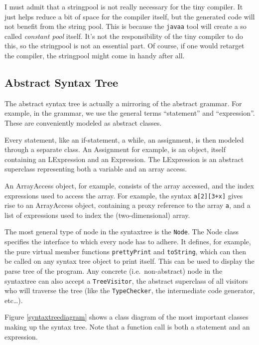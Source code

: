 \documentclass[a4paper]{article}
\begin{document}
I must admit that a stringpool is not really necessary for the tiny compiler.
It just helps reduce a bit of space for the compiler itself, but the generated
code will not benefit from the string pool. This is because the \texttt{javaa}
tool will create a so called \emph{constant pool} itself. It's not the
responsibility of the tiny compiler to do this, so the stringpool is not an
essential part. Of course, if one would retarget the compiler, the stringpool
might come in handy after all.

\subsection{Abstract Syntax Tree}

The abstract syntax tree is actually a mirroring of the abstract grammar.
For example, in the grammar, we use the general terms ``statement'' and
``expression''. These are conveniently modeled as abstract classes.

Every statement, like an if-statement, a while, an assignment, is then modeled
through a separate class. An Assignment for example, is an object, itself
containing an LExpression and an Expression. The LExpression is an abstract
superclass representing both a variable and an array access.

An ArrayAccess object, for example, consists of the array accessed, and the
index expressions used to access the array. For example, the syntax
\texttt{a[2][3+x]} gives rise to an ArrayAccess object, containing a proxy
reference to the array \texttt{a}, and a list of expressions used to index
the (two-dimensional) array.

The most general type of node in the syntaxtree is the \texttt{Node}. The Node
class specifies the interface to which every node has to adhere. It defines,
for example, the pure virtual member functions \texttt{prettyPrint} and
\texttt{toString}, which can then be called on any syntax tree object to print
itself. This can be used to display the parse tree of the program. Any
concrete (i.e.~non-abstract) node in the syntaxtree can also accept a
\texttt{TreeVisitor}, the abstract superclass of all visitors who will
traverse the tree (like the \texttt{TypeChecker}, the intermediate code
generator, etc\ldots{}).

Figure \ref{syntaxtreediagram} shows a class diagram of the most important classes making up the syntax tree. Note that a function call is both a statement and an expression.
\end{document}
